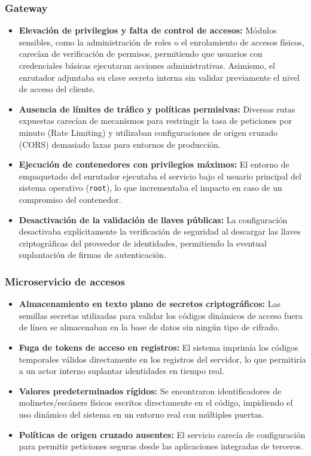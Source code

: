 \newpage

\subsubsection{Gateway}

\begin{itemize}
    \item \textbf{Elevación de privilegios y falta de control de accesos:} Módulos sensibles, como la administración de roles o el enrolamiento de accesos físicos, carecían de verificación de permisos, permitiendo que usuarios con credenciales básicas ejecutaran acciones administrativas. Asimismo, el enrutador adjuntaba su clave secreta interna sin validar previamente el nivel de acceso del cliente.
    \item \textbf{Ausencia de límites de tráfico y políticas permisivas:} Diversas rutas expuestas carecían de mecanismos para restringir la tasa de peticiones por minuto (Rate Limiting) y utilizaban configuraciones de origen cruzado (CORS) demasiado laxas para entornos de producción.
    \item \textbf{Ejecución de contenedores con privilegios máximos:} El entorno de empaquetado del enrutador ejecutaba el servicio bajo el usuario principal del sistema operativo (\texttt{root}), lo que incrementaba el impacto en caso de un compromiso del contenedor.
    \item \textbf{Desactivación de la validación de llaves públicas:} La configuración desactivaba explícitamente la verificación de seguridad al descargar las llaves criptográficas del proveedor de identidades, permitiendo la eventual suplantación de firmas de autenticación.
\end{itemize}

\subsubsection{Microservicio de accesos}

\begin{itemize}
    \item \textbf{Almacenamiento en texto plano de secretos criptográficos:} Las semillas secretas utilizadas para validar los códigos dinámicos de acceso fuera de línea se almacenaban en la base de datos sin ningún tipo de cifrado.
    \item \textbf{Fuga de tokens de acceso en registros:} El sistema imprimía los códigos temporales válidos directamente en los registros del servidor, lo que permitiría a un actor interno suplantar identidades en tiempo real.
    \item \textbf{Valores predeterminados rígidos:} Se encontraron identificadores de molinetes/escáners físicos escritos directamente en el código, impidiendo el uso dinámico del sistema en un entorno real con múltiples puertas.
    \item \textbf{Políticas de origen cruzado ausentes:} El servicio carecía de configuración para permitir peticiones seguras desde las aplicaciones integradas de terceros.
\end{itemize}

